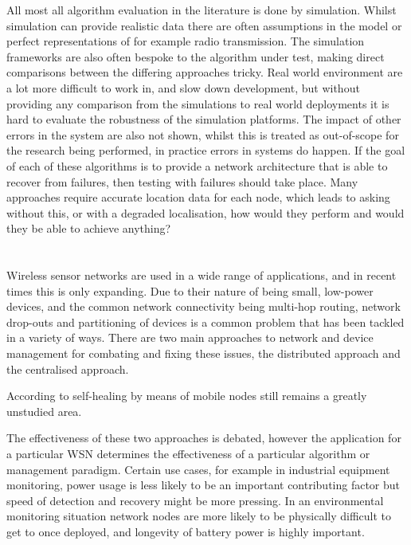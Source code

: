\documentclass[authoryearcitations]{UoYCSproject}
\begin{document}

All most all algorithm evaluation in the literature is done by simulation. Whilst simulation can provide realistic data there are often assumptions in the model or perfect representations of for example radio transmission. The simulation frameworks are also often bespoke to the algorithm under test, making direct comparisons between the differing approaches tricky. Real world environment are a lot more difficult to work in, and slow down development, but without providing any comparison from the simulations to real world deployments it is hard to evaluate the robustness of the simulation platforms. The impact of other errors in the system are also not shown, whilst this is treated as out-of-scope for the research being performed, in practice errors in systems do happen. If the goal of each of these algorithms is to provide a network architecture that is able to recover from failures, then testing with failures should take place. Many approaches require accurate location data for each node, which leads to asking without this, or with a degraded localisation, how would they perform and would they be able to achieve anything?




\chapter{}

Wireless sensor networks are used in a wide range of applications, and in recent times this is only expanding. Due to their nature of being small, low-power devices, and the common network connectivity being multi-hop routing, network drop-outs and partitioning of devices is a common problem that has been tackled in a variety of ways. There are two main approaches to network and device management for combating and fixing these issues, the distributed approach and the centralised approach.

According to \citet{Tong2009} self-healing by means of mobile nodes still remains a greatly unstudied area.

The effectiveness of these two approaches is debated, however the application for a particular WSN determines the effectiveness of a particular algorithm or management paradigm. Certain use cases, for example in industrial equipment monitoring, power usage is less likely to be an important contributing factor but speed of detection and recovery might be more pressing. In an environmental monitoring situation network nodes are more likely to be physically difficult to get to once deployed, and longevity of battery power is highly important.
\end{document}
